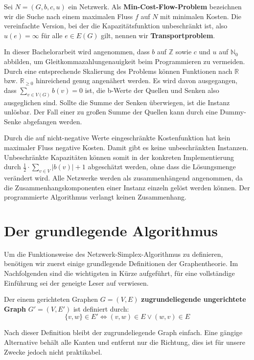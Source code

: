 \begin{defn}Sei $N=(G,b,c,u)$ ein Netzwerk. Als \textbf{Min-Cost-Flow-Problem} bezeichnen wir die Suche nach einem maximalen Fluss $f$ auf $N$ mit minimalen Kosten. Die vereinfachte Version, bei der die Kapazitätsfunktion unbeschränkt ist, also $u(e)=\infty$ für alle $e\in E(G)$ gilt, nennen wir \textbf{Transportproblem}.\end{defn}

In dieser Bachelorarbeit wird angenommen, dass $b$ auf $\mathbb{Z}$ sowie $c$ und $u$ auf $\mathbb{N}_0$ abbilden, um Gleitkommazahlungenauigkeit beim Programmieren zu vermeiden. Durch eine entsprechende Skalierung des Problems können Funktionen nach $\mathbb{R}$ bzw. $\mathbb{R}_{\geq 0}$ hinreichend genug angenähert werden. Es wird davon ausgegangen, dass $\sum_{v\in V(G)} b(v) = 0$ ist, die b-Werte der Quellen und Senken also ausgeglichen sind. Sollte die Summe der Senken überwiegen, ist die Instanz unlösbar. Der Fall einer zu großen Summe der Quellen kann durch eine Dummy-Senke\footnotemark{} abgefangen werden.


Durch die auf nicht-negative Werte eingeschränkte Kostenfunktion hat kein maximaler Fluss negative Kosten. Damit gibt es keine unbeschränkten Instanzen. Unbeschränkte Kapazitäten können somit in der konkreten Implementierung durch $\frac{1}{2}\cdot\sum_{v\in V} |b(v)| + 1$ abgeschätzt werden, ohne dass die Lösungsmenge verändert wird. Alle Netzwerke werden als zusammenhängend angenommen, da die Zusammenhangskomponenten einer Instanz einzeln gelöst werden können. Der programmierte Algorithmus verlangt keinen Zusammenhang.

\section{Der grundlegende Algorithmus}\label{ch:alg}
Um die Funktionsweise des Netzwerk-Simplex-Algorithmus zu definieren, benötigen wir zuerst einige grundlegende Definitionen der Graphentheorie. Im Nachfolgenden sind die wichtigsten in Kürze aufgeführt, für eine vollständige Einführung sei der geneigte Leser auf \cite{Alma} verwiesen.

\begin{defn}Der einem gerichteten Graphen $G=(V,E)$ \textbf{zugrundeliegende ungerichtete Graph} $G'=(V,E')$ ist definiert durch:
\begin{equation*}\{v,w\}\in E' \iff (v,w) \in E \lor (w,v) \in E\end{equation*} \end{defn}
\begin{anm}Nach dieser Definition bleibt der zugrundeliegende Graph einfach. Eine gängige Alternative behält alle Kanten und entfernt nur die Richtung, dies ist für unsere Zwecke jedoch nicht praktikabel.\end{anm}

